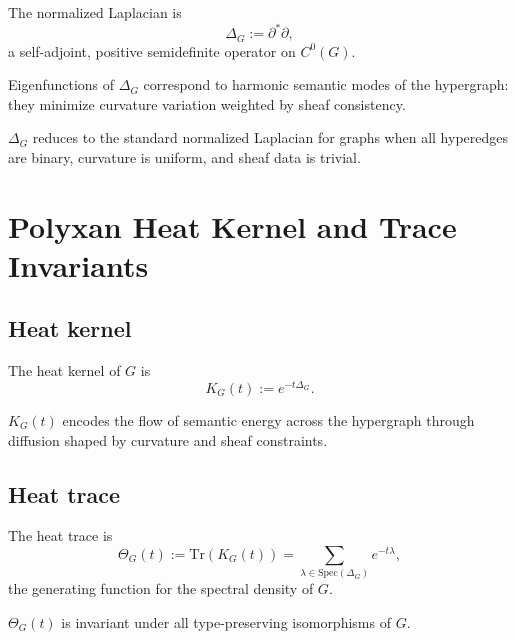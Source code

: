 \begin{definition}
The normalized Laplacian is
\[
\Delta_G := \partial^\ast \partial,
\]
a self-adjoint, positive semidefinite operator on $C^0(G)$.
\end{definition}

Eigenfunctions of $\Delta_G$ correspond to harmonic semantic modes of the
hypergraph: they minimize curvature variation weighted by sheaf consistency.

\begin{remark}
$\Delta_G$ reduces to the standard normalized Laplacian for graphs when all
hyperedges are binary, curvature is uniform, and sheaf data is trivial.
\end{remark}

\section{Polyxan Heat Kernel and Trace Invariants}

\subsection{Heat kernel}

\begin{definition}
The heat kernel of $G$ is
\[
K_G(t) := e^{-t \Delta_G}.
\]
\end{definition}

$K_G(t)$ encodes the flow of semantic energy across the hypergraph through
diffusion shaped by curvature and sheaf constraints.

\subsection{Heat trace}

\begin{definition}
The heat trace is
\[
\Theta_G(t) := \mathrm{Tr}(K_G(t))
= \sum_{\lambda \in \mathrm{Spec}(\Delta_G)} e^{-t\lambda},
\]
the generating function for the spectral density of $G$.
\end{definition}

\begin{theorem}
$\Theta_G(t)$ is invariant under all type-preserving isomorphisms of $G$.
\end{theorem}

